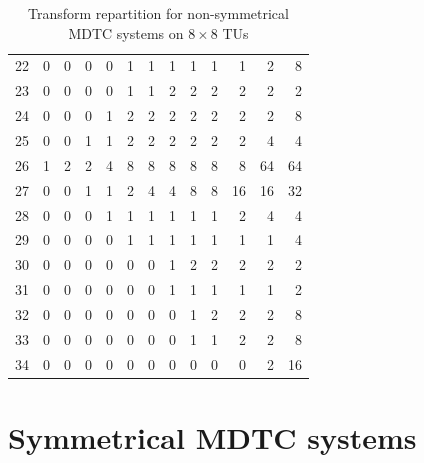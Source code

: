 \documentclass[11pt,a4paper,openright,twoside]{book}
\numberwithin{equation}{section} %
\numberwithin{figure}{section} %
\numberwithin{table}{section} %
\begin{document}
\begin{table}[ht]
\begin{tabular}{c|rrrrrrrrrrrr}
		22 & 0 & 0 & 0 & 0 & 1 & 1  & 1  & 1  & 1  & 1   & 2   & 8 \\
		23 & 0 & 0 & 0 & 0 & 1 & 1  & 2  & 2  & 2  & 2   & 2   & 2 \\
		24 & 0 & 0 & 0 & 1 & 2 & 2  & 2  & 2  & 2  & 2   & 2   & 8 \\
		25 & 0 & 0 & 1 & 1 & 2 & 2  & 2  & 2  & 2  & 2   & 4   & 4 \\
		26 & 1 & 2 & 2 & 4 & 8 & 8  & 8  & 8  & 8  & 8   & 64  & 64 \\
		27 & 0 & 0 & 1 & 1 & 2 & 4  & 4  & 8  & 8  & 16  & 16  & 32 \\
		28 & 0 & 0 & 0 & 1 & 1 & 1  & 1  & 1  & 1  & 2   & 4   & 4 \\
		29 & 0 & 0 & 0 & 0 & 1 & 1  & 1  & 1  & 1  & 1   & 1   & 4 \\
		30 & 0 & 0 & 0 & 0 & 0 & 0  & 1  & 2  & 2  & 2   & 2   & 2 \\
		31 & 0 & 0 & 0 & 0 & 0 & 0  & 1  & 1  & 1  & 1   & 1   & 2 \\
		32 & 0 & 0 & 0 & 0 & 0 & 0  & 0  & 1  & 2  & 2   & 2   & 8 \\
		33 & 0 & 0 & 0 & 0 & 0 & 0  & 0  & 1  & 1  & 2   & 2   & 8 \\
		34 & 0 & 0 & 0 & 0 & 0 & 0  & 0  & 0  & 0  & 0   & 2   & 16 \\
	\end{tabular}
	\caption{Transform repartition for non-symmetrical \acs{MDTC} systems on
	$8\times8$ \acsp{TU}}
	\label{tab:config_nonsym_mdtc_8}
\end{table}

\clearpage

\section*{Symmetrical \acs{MDTC} systems}
\label{sec:symmetrical_mdtc_systems}
\end{document}
